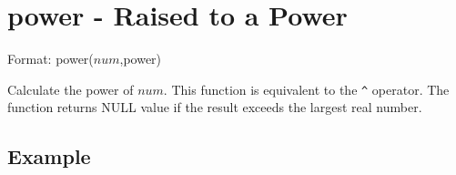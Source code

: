 
%

\section{power - Raised to a Power\label{sect:power}}

Format: power($num$,power)

Calculate the power of $num$. This function is equivalent to the \verb|^| operator. The function returns NULL value if the result exceeds the largest real number. 


\subsection*{Example}


%

